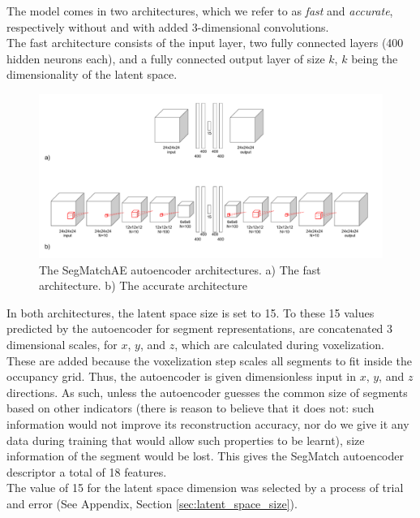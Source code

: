 The model comes in two architectures, which we refer to as \textit{fast} and \textit{accurate}, respectively without and with added 3-dimensional convolutions.\\

The fast architecture consists of the input layer, two fully connected layers (400 hidden neurons each), and a fully connected output layer of size $k$, $k$ being the dimensionality of the latent space.

\begin{figure}
  \centering
  \includegraphics[width=5.2in]{images/architecture.pdf}
  \caption{The SegMatchAE autoencoder architectures. a) The fast architecture. b) The accurate architecture}
  \label{fig:architecture}
\end{figure}

In both architectures, the latent space size is set to 15. To these 15 values predicted by the autoencoder for segment representations, are concatenated 3 dimensional scales, for $x$, $y$, and $z$, which are calculated during voxelization. These are added because the voxelization step scales all segments to fit inside the occupancy grid. Thus, the autoencoder is given dimensionless input in $x$, $y$, and $z$ directions. As such, unless the autoencoder guesses the common size of segments based on other indicators (there is reason to believe that it does not: such information would not improve its reconstruction accuracy, nor do we give it any data during training that would allow such properties to be learnt), size information of the segment would be lost. This gives the SegMatch autoencoder descriptor a total of 18 features.\\

The value of 15 for the latent space dimension was selected by a process of trial and error (See Appendix, Section \ref{sec:latent_space_size}).\\

